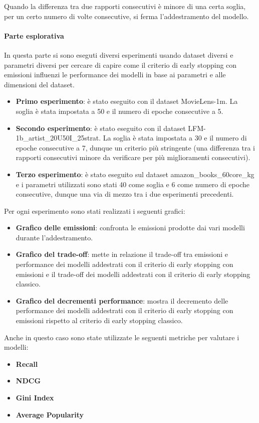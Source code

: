 \noindent Quando la differenza tra due rapporti consecutivi è minore di una certa soglia, per un certo numero di volte consecutive, si ferma l'addestramento del modello.\\
\paragraph{Parte esplorativa}
In questa parte si sono eseguti diversi esperimenti usando dataset diversi e parametri diversi per cercare di capire come il criterio di early stopping con emissioni influenzi le performance dei modelli in base ai parametri e alle dimensioni del dataset.\\
\begin{itemize}
    \item \textbf{Primo esperimento}: è stato eseguito con il dataset MovieLens-1m. La soglia è stata impostata a 50 e il numero di epoche consecutive a 5.
    \item \textbf{Secondo esperimento}: è stato eseguito con il dataset LFM-1b\_artist\_20U50I\_25strat. La soglia è stata impostata a 30 e il numero di epoche consecutive a 7, dunque un criterio più stringente (una differenza tra i rapporti consecutivi minore da verificare per più miglioramenti consecutivi).
    \item \textbf{Terzo esperimento}: è stato eseguito sul dataset amazon\_books\_60core\_kg e i parametri utilizzati sono stati 40 come soglia e 6 come numero di epoche consecutive, dunque una via di mezzo tra i due esperimenti precedenti.
\end{itemize}

Per ogni esperimento sono stati realizzati i seguenti grafici:
\begin{itemize}
    \item \textbf{Grafico delle emissioni}: confronta le emissioni prodotte dai vari modelli durante l'addestramento.
    \item \textbf{Grafico del trade-off}: mette in relazione il trade-off tra emissioni e performance dei modelli addestrati con il criterio di early stopping con emissioni e il trade-off dei modelli addestrati con il criterio di early stopping classico.
    \item \textbf{Grafico del decrementi performance}: mostra il decremento delle performance dei modelli addestrati con il criterio di early stopping con emissioni rispetto al criterio di early stopping classico.
\end{itemize}

Anche in questo caso sono state utilizzate le seguenti metriche per valutare i modelli:
\begin{itemize}
    \item \textbf{Recall}
    \item \textbf{NDCG}
    \item \textbf{Gini Index}
    \item \textbf{Average Popularity}
\end{itemize}

